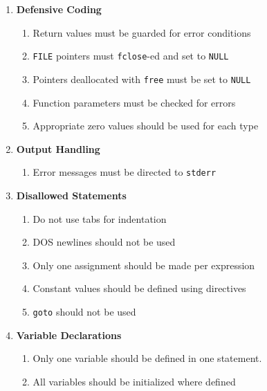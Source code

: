 \documentclass[sigconf]{acmart}
\begin{document}
\begin{enumerate}[label=\Roman*.,ref=\Roman*,]
    \item \textbf{Defensive Coding}
    \begin{enumerate}[left=\itemindent,label=\theenumi.\Alph*,ref=\theenumi.\Alph*]
        \item Return values must be guarded for error conditions
        \item \texttt{FILE} pointers must \texttt{fclose}-ed and set to \texttt{NULL}
        \item Pointers deallocated with \texttt{free} must be set to \texttt{NULL}
        \item Function parameters must be checked for errors
        \item Appropriate zero values should be used for each type
    \end{enumerate}
    
    
    \item \textbf{Output Handling}
    \begin{enumerate}[left=\itemindent,label=\theenumi.\Alph*,ref=\theenumi.\Alph*]
        \item Error messages must be directed to \texttt{stderr}
    \end{enumerate}
    
    \item \textbf{Disallowed Statements}
    \begin{enumerate}[left=\itemindent,label=\theenumi.\Alph*,ref=\theenumi.\Alph*]
        \item Do not use tabs for indentation
        \item DOS newlines should not be used
        \item Only one assignment should be made per expression
        \item Constant values should be defined using directives
        \item \texttt{goto} should not be used
    \end{enumerate}
    
    \item \textbf{Variable Declarations}
    \begin{enumerate}[left=\itemindent,label=\theenumi.\Alph*,ref=\theenumi.\Alph*]
        \item Only one variable should be defined in one statement.
        \item All variables should be initialized where defined
    \end{enumerate}
\end{enumerate}



\end{document}
